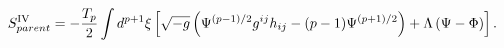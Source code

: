 \begin{equation}
S^{{\rm IV}}_{parent}=-\frac{T_p}{2}\int d^{p+1}{\xi}\left[\sqrt{-g}
\left({\Psi}^{(p-1)/2}g^{ij}h_{ij}-(p-1){\Psi}^{(p+1)/2}\right)
+{\Lambda}\left({\Psi}-{\Phi}\right)\right].
\end{equation}

